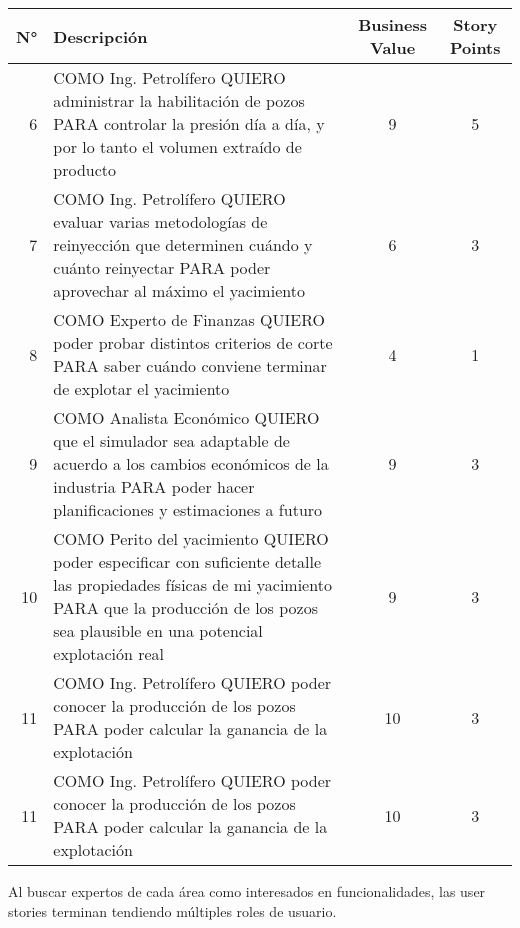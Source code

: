 \begin{center}
  \begin{tabular}{| r | p{10cm} | c | c | }
    \hline
    N° & Descripción & Business Value & Story Points\\  \hline

    6 & COMO Ing. Petrolífero QUIERO administrar la habilitación de pozos PARA controlar
    la presión día a día, y por lo tanto el volumen extraído de producto & 9 & 5\\ \hline

    7 & COMO Ing. Petrolífero QUIERO evaluar varias metodologías de reinyección que determinen cuándo y cuánto reinyectar PARA poder aprovechar al máximo el yacimiento & 6 & 3\\ \hline

    8 & COMO Experto de Finanzas QUIERO poder probar distintos criterios de corte PARA saber
    cuándo conviene terminar de explotar el yacimiento & 4 & 1\\ \hline

    9 & COMO Analista Económico QUIERO que el simulador sea adaptable de acuerdo a los cambios económicos de la industria PARA poder hacer planificaciones y estimaciones a futuro  & 9 & 3\\ \hline

    10 & COMO Perito del yacimiento QUIERO poder especificar con suficiente detalle las propiedades físicas de mi yacimiento PARA que la producción de los pozos sea plausible en una potencial explotación real & 9 & 3\\ \hline

    11 & COMO Ing. Petrolífero QUIERO poder conocer la producción de los pozos PARA poder calcular
    la ganancia de la explotación & 10 & 3\\ \hline

    11 & COMO Ing. Petrolífero QUIERO poder conocer la producción de los pozos PARA poder calcular
    la ganancia de la explotación & 10 & 3\\ \hline

  \end{tabular}
\end{center}

Al buscar expertos de cada área como interesados en funcionalidades, las user stories terminan tendiendo múltiples roles de usuario.

